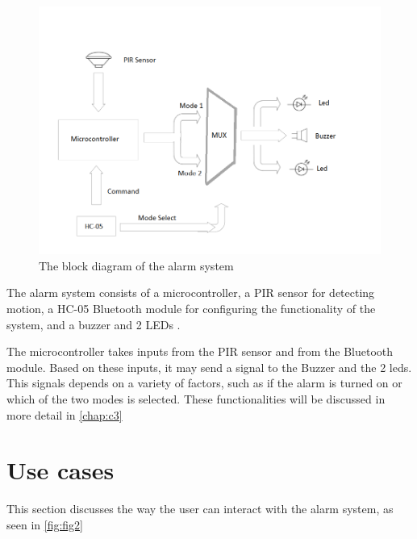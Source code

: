 \documentclass[a4paper,12pt]{report}
\begin{document}
\begin{figure}[h]

\centering
\includegraphics[width=1\textwidth]{fig/blockDiagram}
\caption{The block diagram of the alarm system}
\label{fig:fig1}

\end{figure}

The alarm system consists of a microcontroller, a PIR sensor for detecting motion, a HC-05 Bluetooth module for configuring the functionality of the system, and a buzzer and 2 LEDs .

The microcontroller takes inputs from the PIR sensor and from the Bluetooth module. Based on these inputs, it may send a signal to the Buzzer and the 2 leds. This signals depends on a variety of factors, such as if the alarm is turned on or which of the two modes is selected. These functionalities will be discussed in more detail in \autoref{chap:c3}

\section{Use cases}

This section discusses the way the user can interact with the alarm system, as seen in \autoref{fig:fig2}
\end{document}
